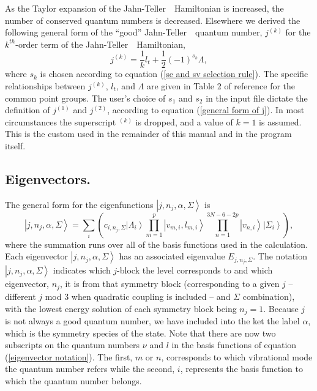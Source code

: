 \documentclass{article}
\newcommand{\JT}{Jahn-Teller\ }
\begin{document}
As the Taylor expansion of the \JT\ Hamiltonian is increased, the
number of conserved quantum numbers is decreased. Elsewhere\cite{tab4}
we derived the following general form of the ``good'' \JT\ quantum
number, $j^{(k)}$ for the $k^{th}$-order term of the \JT\ Hamiltonian,
\begin{equation}
j^{(k)}=\frac{1}{k}l_t+ \frac12 (-1)^{s_k }\Lambda ,
\label{general form of j}
\end{equation}
where $s_k$ is chosen according to equation (\ref{se and sv selection
  rule}). The specific relationships between $j^{(k)}$, $l_t$, and
$\Lambda $ are given in Table 2 of reference  for the
common point groups. The user's choice of $s_1$ and $s_2$ in the input
file dictate the definition of $j^{(1)}$ and $j^{(2)}$, according to
equation (\ref{general form of j}). 
In most circumstances the superscript $^{(k)}$ is
dropped, and a value of $k=1$ is assumed. This is the custom used in
the remainder of this manual and in the program itself.

\subsection{Eigenvectors.} The general form for the eigenfunctions 
$\left| j,n_{j},\alpha ,\Sigma \right\rangle $ is 
\begin{equation}
\left| j,n_{j},\alpha ,\Sigma \right\rangle =\sum_{i}\left( c_{i,n_{j},\Sigma }\left|
\Lambda _{i}\right\rangle 
\prod\limits_{m=1}^{p}\left| v_{m,i},l_{m,i}\right\rangle
\prod\limits_{n=1}^{3N - 6 - 2p}\left| v_{n,i}\right\rangle
 \left| \Sigma _i \right\rangle 
\right), \label{eigenvector notation}
\end{equation}
where the summation runs over all of the basis functions used in the
calculation. Each eigenvector $\left| j,n_{j},\alpha ,\Sigma \right\rangle $
has an associated eigenvalue $E_{j,n_{j},\Sigma }$. The notation $\left|
j,n_{j},\alpha ,\Sigma \right\rangle $ indicates which $j$-block the level
corresponds to and which eigenvector, $n_{j}$, it is from that symmetry
block (corresponding to a given $j$ -- different $j$ mod 3 when
quadratic coupling is included -- and $\Sigma$ combination), with the
lowest energy solution of each symmetry block being $n_{j}=1$.  
Because $j$
is not always a good quantum number, we have included into the ket the label 
$\alpha $, which is the symmetry species 
of the state. Note that there are now two subscripts on the quantum numbers $\nu $ and $l$
in the basis functions of equation (\ref{eigenvector notation}). 
The first, $m$ or $n$, corresponds to which vibrational
mode the quantum number refers while the second, $i$, represents the basis
function to which the quantum number belongs. 
\end{document}
